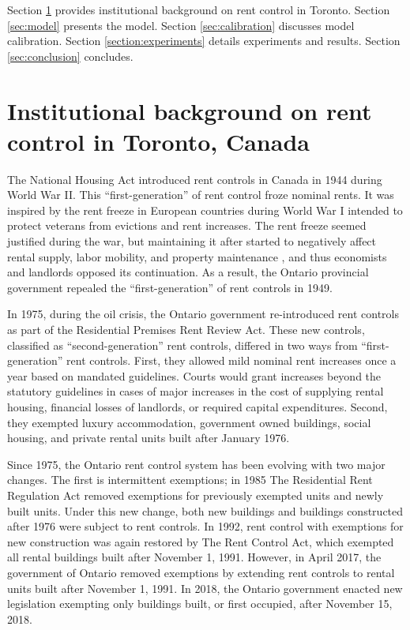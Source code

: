 \documentclass[parskip=full]{article}
\begin{document}
Section \ref{sec:insitutional_background} provides institutional background on rent control in Toronto. Section \ref{sec:model} presents the model. Section \ref{sec:calibration} discusses model calibration. Section \ref{section:experiments} details experiments and results. Section \ref{sec:conclusion} concludes.

\section{Institutional background on rent control in Toronto, Canada}\label{sec:insitutional_background}
The National Housing Act introduced rent controls in Canada in 1944 during World War II. This “first-generation” of rent control froze nominal rents. It was inspired by the rent freeze in European countries during World War I intended to protect veterans from evictions and rent increases. The rent freeze seemed justified during the war, but maintaining it after started to negatively affect rental supply, labor mobility, and property maintenance \citep{arnott-1995}, and thus economists and landlords opposed its continuation. As a result, the Ontario provincial government repealed the “first-generation” of rent controls in 1949.  

In 1975, during the oil crisis, the Ontario government re-introduced rent controls as part of the Residential Premises Rent Review Act. These new controls, classified as “second-generation” rent controls, differed in two ways from “first-generation” rent controls. First, they allowed mild nominal rent increases once a year based on mandated guidelines. Courts would grant increases beyond the statutory guidelines in cases of major increases in the cost of supplying rental housing, financial losses of landlords, or required capital expenditures. Second, they exempted luxury accommodation, government owned buildings, social housing, and private rental units built after January 1976.

Since 1975, the Ontario rent control system has been evolving with two major changes. The first is intermittent exemptions; in 1985 The Residential Rent Regulation Act removed exemptions for previously exempted units and newly built units. Under this new change, both new buildings and buildings constructed after 1976 were subject to rent controls. In 1992, rent control with exemptions for new construction was again restored by The Rent Control Act, which exempted all rental buildings built after November 1, 1991. However, in April 2017, the government of Ontario removed exemptions by extending rent controls to rental units built after November 1, 1991. In 2018, the Ontario government enacted new legislation exempting only buildings built, or first occupied, after November 15, 2018.
\end{document}
